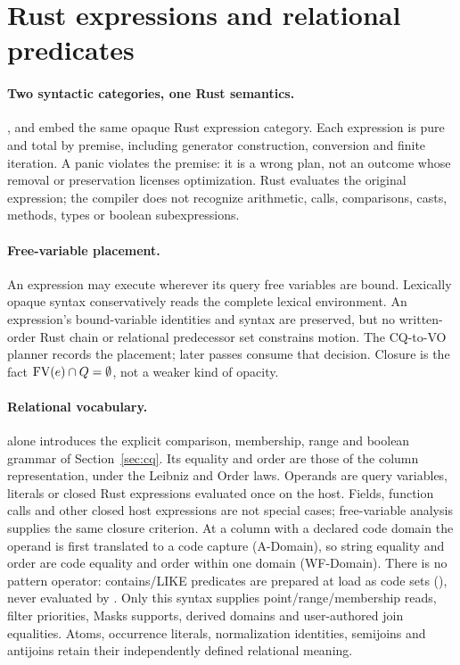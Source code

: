\section{Rust expressions and relational predicates}
\label{sec:guards-design}

\paragraph{Two syntactic categories, one Rust semantics.}
,  and  embed the same
opaque Rust expression category. Each expression is pure and total by
premise, including generator construction, conversion and finite iteration.
A panic violates the premise: it is a wrong plan, not an outcome whose
removal or preservation licenses optimization. Rust evaluates the original
expression; the compiler does not recognize arithmetic, calls, comparisons,
casts, methods, types or boolean subexpressions.

\paragraph{Free-variable placement.}
An expression may execute wherever its query free variables are bound.
Lexically opaque syntax conservatively reads the complete lexical environment.
An expression's bound-variable identities and syntax are preserved, but no
written-order Rust chain or relational predecessor set constrains motion.
The CQ-to-VO planner records the placement; later passes consume that decision.
Closure is the fact $\operatorname{FV}(e)\cap Q=\emptyset$, not a weaker kind of opacity.

\paragraph{Relational vocabulary.}
 alone introduces the explicit comparison, membership, range
and boolean grammar of Section~\ref{sec:cq}. Its equality and order are those
of the column representation, under the Leibniz and Order laws. Operands
are query variables, literals or closed Rust expressions evaluated once on
the host. Fields, function calls and other closed host expressions are not
special cases; free-variable analysis supplies the same closure criterion.
At a column with a declared code domain the operand is first translated to a
code capture (A-Domain), so string equality and order are code equality and
order within one domain (WF-Domain). There is no pattern operator:
contains/LIKE predicates are prepared at load as code sets
(), never evaluated by .
Only this syntax supplies point/range/membership reads, filter priorities,
Masks supports, derived domains and user-authored join equalities. Atoms,
occurrence literals, normalization identities, semijoins and antijoins retain
their independently defined relational meaning.

